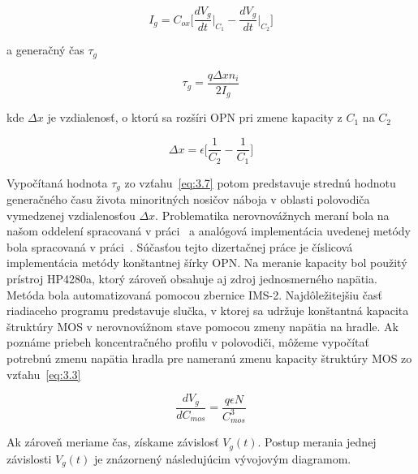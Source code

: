 \begin{equation}\label{eq:3.6}
  I_g = C_{ox} \bigg[\frac{dV_g}{dt}\Big\rvert_{C_1} - \frac{dV_g}{dt}\Big\rvert_{C_2}\bigg]
\end{equation}

a generačný čas $\tau_g$

\begin{equation}\label{eq:3.7}
  \tau_g = \frac{q\Delta x n_i}{2I_g}
\end{equation}

kde $\Delta x$ je vzdialenosť, o ktorú sa rozšíri OPN pri zmene
kapacity z $C_1$ na $C_2$

\begin{equation}\label{eq:3.8}
  \Delta x = \epsilon \Big[\frac{1}{C_2} - \frac{1}{C_1}\Big]
\end{equation}

Vypočítaná hodnota $\tau_g$ zo vzťahu~\ref{eq:3.7} potom predstavuje
strednú hodnotu generačného času života minoritných nosičov náboja v
oblasti polovodiča vymedzenej vzdialenosťou $\Delta x$.  Problematika
nerovnovážnych meraní bola na našom oddelení spracovaná v
práci~\cite{1.6} a analógová implementácia uvedenej metódy bola
spracovaná v práci~\cite{3.13}. Súčasťou tejto dizertačnej práce je
číslicová implementácia metódy konštantnej šírky OPN\@. Na meranie
kapacity bol použitý prístroj HP4280a, ktorý zároveň obsahuje aj zdroj
jednosmerného napätia. Metóda bola automatizovaná pomocou zbernice
IMS-2. Najdôležitejšiu časť riadiaceho programu predstavuje slučka, v
ktorej sa udržuje konštantná kapacita štruktúry MOS v nerovnovážnom
stave pomocou zmeny napätia na hradle.  Ak poznáme priebeh
koncentračného profilu v polovodiči, môžeme vypočítať potrebnú zmenu
napätia hradla pre nameranú zmenu kapacity štruktúry MOS zo
vzťahu~\ref{eq:3.3}

\begin{equation}\label{eq:3.9}
  \frac{dV_g}{dC_{mos}} = \frac{q\epsilon N}{C^3_{mos}}
\end{equation}

Ak zároveň meriame čas, získame závislosť $V_g(t)$. Postup merania
jednej závislosti $V_g(t)$ je znázornený následujúcim vývojovým
diagramom.

